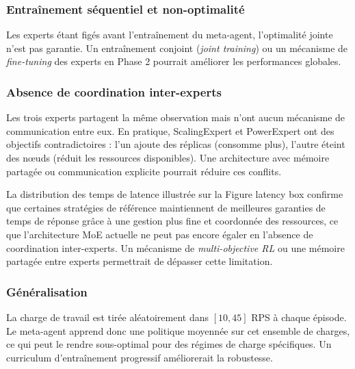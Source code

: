 \subsubsection{Entraînement séquentiel et non-optimalité}

Les experts étant figés avant l'entraînement du meta-agent, l'optimalité
jointe n'est pas garantie. Un entraînement conjoint (\textit{joint
training}) ou un mécanisme de \textit{fine-tuning} des experts en Phase 2
pourrait améliorer les performances globales.

\subsubsection{Absence de coordination inter-experts}

Les trois experts partagent la même observation mais n'ont aucun mécanisme
de communication entre eux. En pratique, ScalingExpert et PowerExpert ont
des objectifs contradictoires : l'un ajoute des réplicas (consomme plus),
l'autre éteint des nœuds (réduit les ressources disponibles). Une
architecture avec mémoire partagée ou communication explicite pourrait
réduire ces conflits.

La distribution des temps de latence illustrée sur la
Figure latency box confirme que certaines stratégies de référence
maintiennent de meilleures garanties de temps de réponse grâce à une gestion
plus fine et coordonnée des ressources, ce que l'architecture MoE actuelle
ne peut pas encore égaler en l'absence de coordination inter-experts.
Un mécanisme de \textit{multi-objective RL} ou une mémoire partagée entre
experts permettrait de dépasser cette limitation.


\subsubsection{Généralisation}

La charge de travail est tirée aléatoirement dans $[10, 45]$ RPS à chaque
épisode. Le meta-agent apprend donc une politique moyennée sur cet
ensemble de charges, ce qui peut le rendre sous-optimal pour des régimes
de charge spécifiques. Un curriculum d'entraînement progressif améliorerait
la robustesse.
